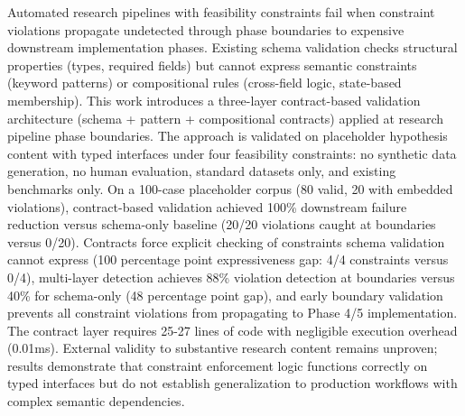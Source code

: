 
Automated research pipelines with feasibility constraints fail when constraint violations propagate undetected through phase boundaries to expensive downstream implementation phases. Existing schema validation checks structural properties (types, required fields) but cannot express semantic constraints (keyword patterns) or compositional rules (cross-field logic, state-based membership). This work introduces a three-layer contract-based validation architecture (schema + pattern + compositional contracts) applied at research pipeline phase boundaries. The approach is validated on placeholder hypothesis content with typed interfaces under four feasibility constraints: no synthetic data generation, no human evaluation, standard datasets only, and existing benchmarks only. On a 100-case placeholder corpus (80 valid, 20 with embedded violations), contract-based validation achieved 100\% downstream failure reduction versus schema-only baseline (20/20 violations caught at boundaries versus 0/20). Contracts force explicit checking of constraints schema validation cannot express (100 percentage point expressiveness gap: 4/4 constraints versus 0/4), multi-layer detection achieves 88\% violation detection at boundaries versus 40\% for schema-only (48 percentage point gap), and early boundary validation prevents all constraint violations from propagating to Phase 4/5 implementation. The contract layer requires 25-27 lines of code with negligible execution overhead (0.01ms). External validity to substantive research content remains unproven; results demonstrate that constraint enforcement logic functions correctly on typed interfaces but do not establish generalization to production workflows with complex semantic dependencies.
